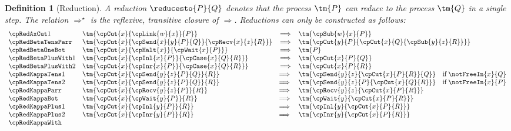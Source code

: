 \documentclass[submission,copyright,creativecommons]{eptcs}
\newtheorem{definition}{Definition}
\begin{document}
\begin{definition}[Reduction]\label{def:cp-reduction}
  A reduction $\reducesto{P}{Q}$ denotes that the process $\tm{P}$ can reduce
  to the process $\tm{Q}$ in a single step.
  The relation $\Longrightarrow^\star$ is the reflexive, transitive closure of
  $\Longrightarrow$.
  Reductions can only be constructed as follows:
  \begin{gather*}
    \begin{array}{llcll}
      \cpRedAxCut1
      & \tm{\cpCut{x}{\cpLink{w}{x}}{P}}
      & \Longrightarrow
      & \tm{\cpSub{w}{x}{P}} 
      \\
      \cpRedBetaTensParr
      & \tm{\cpCut{x}{\cpSend{x}{y}{P}{Q}}{\cpRecv{x}{z}{R}}}
      & \Longrightarrow
      & \tm{\cpCut{y}{P}{\cpCut{x}{Q}{\cpSub{y}{z}{R}}}}
      \\
      \cpRedBetaOneBot
      & \tm{\cpCut{x}{\cpHalt{x}}{\cpWait{x}{P}}}
      & \Longrightarrow
      & \tm{P}
      \\
      \cpRedBetaPlusWith1
      & \tm{\cpCut{x}{\cpInl{x}{P}}{\cpCase{x}{Q}{R}}}
      & \Longrightarrow
      & \tm{\cpCut{x}{P}{Q}}
      \\
      \cpRedBetaPlusWith2
      & \tm{\cpCut{x}{\cpInr{x}{P}}{\cpCase{x}{Q}{R}}}
      & \Longrightarrow
      & \tm{\cpCut{x}{P}{R}}
      \\
      \cpRedKappaTens1
      & \tm{\cpCut{x}{\cpSend{y}{z}{P}{Q}}{R}}
      & \Longrightarrow \;
      & \tm{\cpSend{y}{z}{\cpCut{x}{P}{R}}{Q}}
        \quad \text{if} \; \notFreeIn{x}{Q}
      \\
      \cpRedKappaTens2
      & \tm{\cpCut{x}{\cpSend{y}{z}{P}{Q}}{R}}
      & \Longrightarrow \;
      & \tm{\cpSend{y}{z}{P}{\cpCut{x}{Q}{R}}}
        \quad \text{if} \; \notFreeIn{x}{P}
      \\
      \cpRedKappaParr
      & \tm{\cpCut{x}{\cpRecv{y}{z}{P}}{R}}
      & \Longrightarrow \;
      & \tm{\cpRecv{y}{z}{\cpCut{x}{P}{R}}}
      \\
      \cpRedKappaBot
      & \tm{\cpCut{x}{\cpWait{y}{P}}{R}}
      & \Longrightarrow \;
      & \tm{\cpWait{y}{\cpCut{x}{P}{R}}}
      \\
      \cpRedKappaPlus1
      & \tm{\cpCut{x}{\cpInl{y}{P}}{R}}
      & \Longrightarrow \;
      & \tm{\cpInl{y}{\cpCut{x}{P}{R}}}
      \\
      \cpRedKappaPlus2
      &\tm{\cpCut{x}{\cpInr{y}{P}}{R}}
      & \Longrightarrow \;
      & \tm{\cpInr{y}{\cpCut{x}{P}{R}}}
      \\
      \cpRedKappaWith

\end{array}
\end{gather*}
\end{definition}
\end{document}
